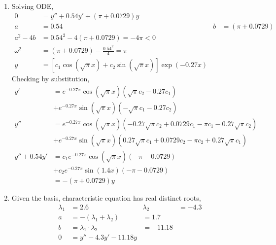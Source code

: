 \begin{enumerate}
    \item Solving ODE,
          \begin{align}
              0          & = y'' + 0.54y' + (\pi + 0.0729)y                        \\
              a          & = 0.54                                                &
              b          & = (\pi + 0.0729)                                        \\
              a^{2} - 4b & = 0.54^{2} - 4(\pi + 0.0729) = -4\pi < 0                \\
              \omega^{2} & = (\pi + 0.0729) - \frac{0.54^{2}}{4} = \pi             \\
              y          & = [c_{1}\cos(\sqrt{\pi} x) + c_{2}\sin(\sqrt{\pi} x)]
              \exp(-0.27x)
          \end{align}
          Checking by substitution,
          \begin{align}
              y'           & = e^{-0.27x}\cos(\sqrt{\pi} x) (\sqrt{\pi} c_{2}
              - 0.27c_{1})                                                        \\
                           & + e^{-0.27x}\sin(\sqrt{\pi} x)(-\sqrt{\pi} c_{1}
              - 0.27c_{2})                                                        \\
              y''          & = e^{-0.27x}\cos(\sqrt{\pi} x)(-0.27\sqrt{\pi} c_{2}
              + 0.0729c_{1} - \pi c_{1} - 0.27\sqrt{\pi} c_{2})                   \\
                           & + e^{-0.27x}\sin(\sqrt{\pi} x)(0.27\sqrt{\pi} c_{1}
              + 0.0729c_{2} - \pi c_{2} + 0.27\sqrt{\pi} c_{1})                   \\
              y'' + 0.54y' & = c_{1}e^{-0.27x}\cos(\sqrt{\pi} x)(-\pi-0.0729)     \\
                           & + c_{2}e^{-0.27x}\sin(1.4x)(-\pi-0.0729)             \\
                           & = -(\pi + 0.0729) y
          \end{align}

    \item Given the basis, characteristic equation has real distinct roots,
          \begin{align}
              \lambda_{1} & = 2.6                           & \lambda_{2} & = -4.3 \\
              a           & = -(\lambda_{1} + \lambda_{2})  & = 1.7                \\
              b           & = \lambda_{1} \cdot \lambda_{2} & = -11.18             \\
              0           & = y'' -4.3y' - 11.18y
          \end{align}


\end{enumerate}
